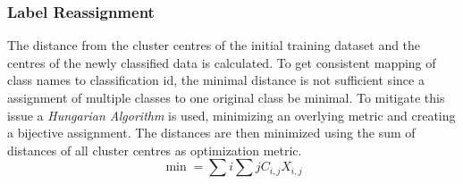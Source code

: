 \documentclass[12pt,a4paper, english]{article}
\begin{document}
    \subsubsection{Label Reassignment}
    The distance from the cluster centres of the initial training dataset and the centres of the newly classified data is calculated. 
    To get consistent mapping of class names to classification id, the minimal distance is not sufficient since a assignment of multiple classes to one original class be minimal. 
    To mitigate this issue a \textit{Hungarian Algorithm} is used, minimizing an overlying metric and creating a bijective assignment. 
    The distances are then minimized using the sum of distances of all cluster centres as optimization metric.
      \begin{equation}
        \min = \sum{i}\sum{j} C_{i,j}X_{i,j}
      \end{equation}
\end{document}
